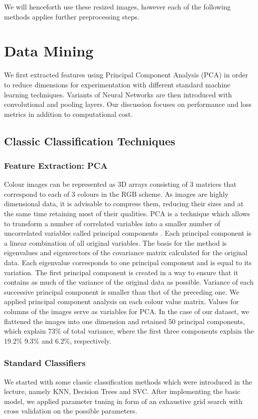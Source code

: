 \documentclass[11pt,titlepage,oneside,openany]{article}
\begin{document}
We will henceforth use these resized images, however each of the following methods applies further preprocessing steps.


\section{Data Mining}
\label{sec:class}

We first extracted features using Principal Component Analysis (PCA) in order to reduce dimensions for experimentation with different standard machine learning techniques. Variants of Neural Networks are then introduced with convolutional and pooling layers. Our discussion focuses on performance and loss metrics in addition to computational cost.

\subsection{Classic Classification Techniques}

\subsubsection*{Feature Extraction: PCA}
Colour images can be represented as 3D arrays consisting of 3 matrices that correspond to each of 3 colours in the RGB scheme. As images are highly dimensional data, it is advisable to compress them, reducing their sizes and at the same time retaining most of their qualities.
PCA is a technique which allows to transform a number of correlated variables into a smaller number of uncorrelated variables called principal components \cite{pca}. Each principal component is a linear combination of all original variables. The basis for the method is eigenvalues and eigenvectors of the covariance matrix calculated for the original data. Each eigenvalue corresponds to one principal component and is equal to its variation. The first principal component is created in a way to ensure that it contains as much of the variance of the original data as possible. Variance of each successive principal component is smaller than that of the preceding one. We applied principal component analysis on each colour value matrix. Values for columns of the images serve as variables for PCA.
In the case of our dataset, we flattened the images into one dimension and retained 50 principal components, which explain 73\% of total variance, where the first three components explain the 19.2\% 9.3\% and 6.2\%, respectively.

\subsubsection*{Standard Classifiers}
We started with some classic classification methods which were introduced in the lecture, namely KNN, Decision Trees and SVC. After implementing the basic model, we applied parameter tuning in form of an exhaustive grid search with cross validation on the possible parameters. 
\end{document}
